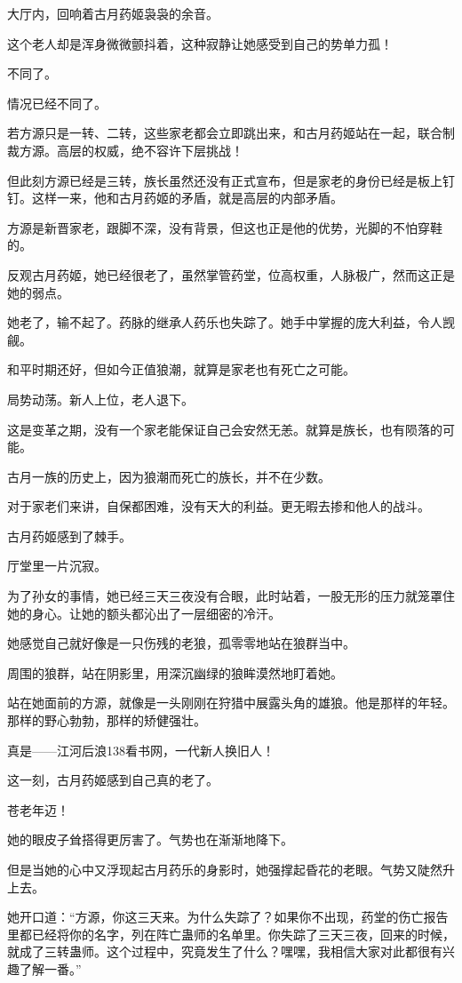 \begin{this_body}
大厅内，回响着古月药姬袅袅的余音。

这个老人却是浑身微微颤抖着，这种寂静让她感受到自己的势单力孤！

不同了。

情况已经不同了。

若方源只是一转、二转，这些家老都会立即跳出来，和古月药姬站在一起，联合制裁方源。高层的权威，绝不容许下层挑战！

但此刻方源已经是三转，族长虽然还没有正式宣布，但是家老的身份已经是板上钉钉。这样一来，他和古月药姬的矛盾，就是高层的内部矛盾。

方源是新晋家老，跟脚不深，没有背景，但这也正是他的优势，光脚的不怕穿鞋的。

反观古月药姬，她已经很老了，虽然掌管药堂，位高权重，人脉极广，然而这正是她的弱点。

她老了，输不起了。药脉的继承人药乐也失踪了。她手中掌握的庞大利益，令人觊觎。

和平时期还好，但如今正值狼潮，就算是家老也有死亡之可能。

局势动荡。新人上位，老人退下。

这是变革之期，没有一个家老能保证自己会安然无恙。就算是族长，也有陨落的可能。

古月一族的历史上，因为狼潮而死亡的族长，并不在少数。

对于家老们来讲，自保都困难，没有天大的利益。更无暇去掺和他人的战斗。

古月药姬感到了棘手。

厅堂里一片沉寂。

为了孙女的事情，她已经三天三夜没有合眼，此时站着，一股无形的压力就笼罩住她的身心。让她的额头都沁出了一层细密的冷汗。

她感觉自己就好像是一只伤残的老狼，孤零零地站在狼群当中。

周围的狼群，站在阴影里，用深沉幽绿的狼眸漠然地盯着她。

站在她面前的方源，就像是一头刚刚在狩猎中展露头角的雄狼。他是那样的年轻。那样的野心勃勃，那样的矫健强壮。

真是——江河后浪138看书网，一代新人换旧人！

这一刻，古月药姬感到自己真的老了。

苍老年迈！

她的眼皮子耸搭得更厉害了。气势也在渐渐地降下。

但是当她的心中又浮现起古月药乐的身影时，她强撑起昏花的老眼。气势又陡然升上去。

她开口道：“方源，你这三天来。为什么失踪了？如果你不出现，药堂的伤亡报告里都已经将你的名字，列在阵亡蛊师的名单里。你失踪了三天三夜，回来的时候，就成了三转蛊师。这个过程中，究竟发生了什么？嘿嘿，我相信大家对此都很有兴趣了解一番。”


\end{this_body}

